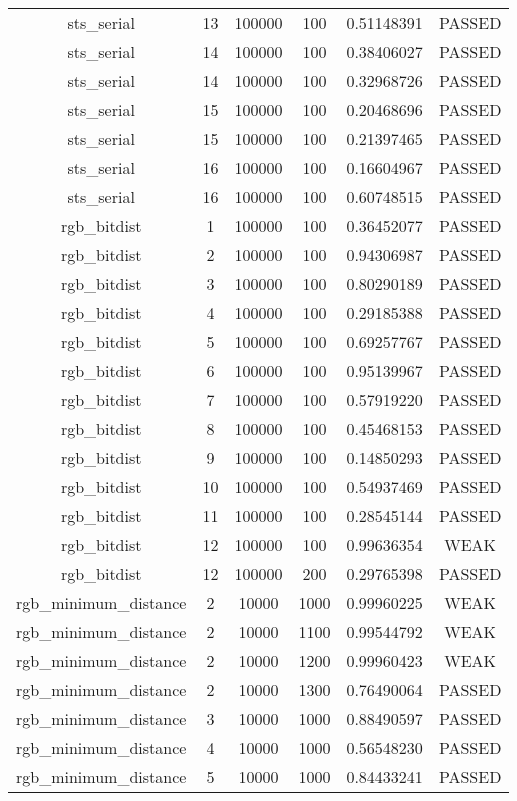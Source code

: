 \begin{longtable}{cccccc}
sts\_serial & 13 & 100000 & 100 & 0.51148391 & PASSED \\
sts\_serial & 14 & 100000 & 100 & 0.38406027 & PASSED \\
sts\_serial & 14 & 100000 & 100 & 0.32968726 & PASSED \\
sts\_serial & 15 & 100000 & 100 & 0.20468696 & PASSED \\
sts\_serial & 15 & 100000 & 100 & 0.21397465 & PASSED \\
sts\_serial & 16 & 100000 & 100 & 0.16604967 & PASSED \\
sts\_serial & 16 & 100000 & 100 & 0.60748515 & PASSED \\
rgb\_bitdist & 1 & 100000 & 100 & 0.36452077 & PASSED \\
rgb\_bitdist & 2 & 100000 & 100 & 0.94306987 & PASSED \\
rgb\_bitdist & 3 & 100000 & 100 & 0.80290189 & PASSED \\
rgb\_bitdist & 4 & 100000 & 100 & 0.29185388 & PASSED \\
rgb\_bitdist & 5 & 100000 & 100 & 0.69257767 & PASSED \\
rgb\_bitdist & 6 & 100000 & 100 & 0.95139967 & PASSED \\
rgb\_bitdist & 7 & 100000 & 100 & 0.57919220 & PASSED \\
rgb\_bitdist & 8 & 100000 & 100 & 0.45468153 & PASSED \\
rgb\_bitdist & 9 & 100000 & 100 & 0.14850293 & PASSED \\
rgb\_bitdist & 10 & 100000 & 100 & 0.54937469 & PASSED \\
rgb\_bitdist & 11 & 100000 & 100 & 0.28545144 & PASSED \\
rgb\_bitdist & 12 & 100000 & 100 & 0.99636354 & WEAK \\
rgb\_bitdist & 12 & 100000 & 200 & 0.29765398 & PASSED \\
rgb\_minimum\_distance & 2 & 10000 & 1000 & 0.99960225 & WEAK \\
rgb\_minimum\_distance & 2 & 10000 & 1100 & 0.99544792 & WEAK \\
rgb\_minimum\_distance & 2 & 10000 & 1200 & 0.99960423 & WEAK \\
rgb\_minimum\_distance & 2 & 10000 & 1300 & 0.76490064 & PASSED \\
rgb\_minimum\_distance & 3 & 10000 & 1000 & 0.88490597 & PASSED \\
rgb\_minimum\_distance & 4 & 10000 & 1000 & 0.56548230 & PASSED \\
rgb\_minimum\_distance & 5 & 10000 & 1000 & 0.84433241 & PASSED \\

\end{longtable}

